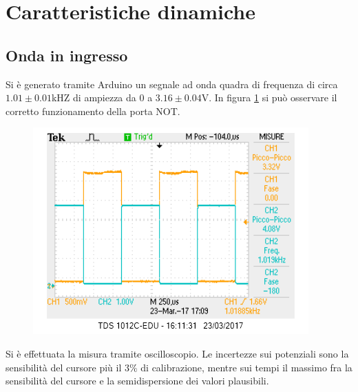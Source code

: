 \documentclass[10pt,a4paper]{article}
\begin{document}
\section{Caratteristiche dinamiche}
\subsection{Onda in ingresso}
Si è generato tramite Arduino un segnale ad onda quadra di frequenza di circa $1.01\pm0.01$kHZ di ampiezza da 0 a $3.16\pm 0.04$V.
In figura \ref{fig:ondanot} si può osservare il corretto funzionamento della porta NOT.
\begin{figure}
\centering
\includegraphics[scale=0.7]{ondanot.png}
\caption{\label{fig:ondanot}}
\end{figure}
Si è effettuata la misura tramite oscilloscopio. Le incertezze sui potenziali sono la sensibilità del cursore più il $3\%$ di calibrazione, mentre sui tempi il massimo fra la sensibilità del cursore e la semidispersione dei valori plausibili.
\end{document}
